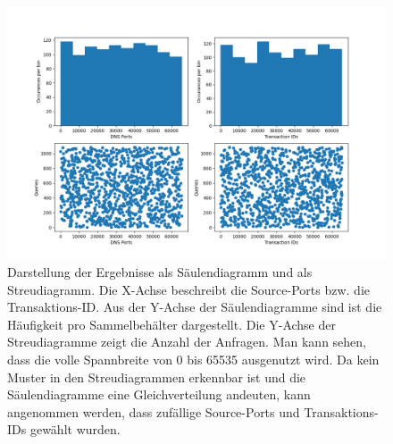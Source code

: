 \documentclass[a4paper]{book}
\begin{document}
\begin{large}
\begin{onehalfspace}
\vfill \pagebreak

\begin{figure}[ht]
\begin{center}
\includegraphics[scale=0.5]{images/DNS_port_and_id_distribution_graph.png} 
\caption{Darstellung der Ergebnisse als Säulendiagramm und als Streudiagramm. Die X-Achse beschreibt die Source-Ports bzw. die Transaktions-ID. Aus der Y-Achse der Säulendiagramme sind ist die Häufigkeit pro Sammelbehälter dargestellt. Die Y-Achse der Streudiagramme zeigt die Anzahl der Anfragen. Man kann sehen, dass die volle Spannbreite von 0 bis 65535 ausgenutzt wird. Da kein Muster in den Streudiagrammen erkennbar ist und die Säulendiagramme eine Gleichverteilung andeuten, kann angenommen werden, dass zufällige Source-Ports und Transaktions-IDs gewählt wurden. }
\label{fig:DNS Randomization}
\end{center}
\end{figure}

\end{onehalfspace}




\end{large}
\end{document}
